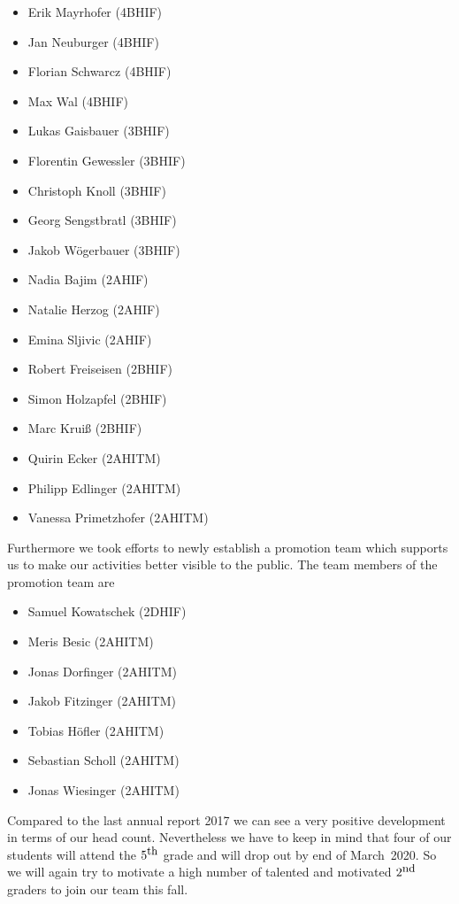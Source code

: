 \documentclass[11pt]{article}
\begin{document}
\begin{multicols}{2}
\begin{itemize}
	\item Erik Mayrhofer (4BHIF)
	\item Jan Neuburger (4BHIF)
	\item Florian Schwarcz (4BHIF)
	\item Max Wal (4BHIF)
	\item Lukas Gaisbauer (3BHIF)
	\item Florentin Gewessler (3BHIF)
	\item Christoph Knoll (3BHIF)
	\item Georg Sengstbratl (3BHIF)
	\item Jakob Wögerbauer (3BHIF)
	\item Nadia Bajim (2AHIF)
	\item Natalie Herzog (2AHIF)
	\item Emina Sljivic (2AHIF)
	\item Robert Freiseisen (2BHIF)
	\item Simon Holzapfel (2BHIF)
	\item Marc Kruiß (2BHIF)
	\item Quirin Ecker (2AHITM)
	\item Philipp Edlinger (2AHITM)
	\item Vanessa Primetzhofer (2AHITM)
\end{itemize}
\end{multicols}

Furthermore we took efforts to newly establish a promotion team which supports us to make our activities better visible to the public. The team members of the promotion team are

\begin{multicols}{2}
\begin{itemize}
	\item Samuel Kowatschek (2DHIF)
	\item Meris Besic (2AHITM)
	\item Jonas Dorfinger (2AHITM)
	\item Jakob Fitzinger (2AHITM)
	\item Tobias Höfler (2AHITM)
	\item Sebastian Scholl (2AHITM)
	\item Jonas Wiesinger (2AHITM)
\end{itemize}
\end{multicols}

Compared to the last annual report 2017 we can see a very positive development in terms of our head count. Nevertheless we have to keep in mind that four of our students will attend the $5^{\textrm{\small th}}$ grade and will drop out by end of March~2020. So we will again try to motivate a high number of talented and motivated $2^{\textrm{\small nd}}$ graders to join our team this fall.
\end{document}
